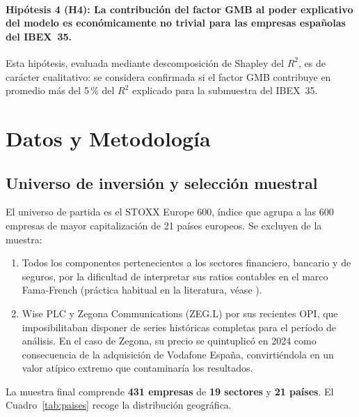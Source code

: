 \documentclass[12pt, a4paper]{article}
\begin{document}
\paragraph{Hip\'otesis 4 (H4): La contribuci\'on del factor GMB al poder explicativo
del modelo es econ\'omicamente no trivial para las empresas espa\~nolas del IBEX~35.}
Esta hip\'otesis, evaluada mediante descomposici\'on de Shapley del $R^2$, es de
car\'acter cualitativo: se considera confirmada si el factor GMB contribuye en promedio
m\'as del 5\,\% del $R^2$ explicado para la submuestra del IBEX~35.

\section{Datos y Metodolog\'ia}
\label{sec:metodologia}

\subsection{Universo de inversi\'on y selecci\'on muestral}
\label{subsec:muestra}

El universo de partida es el STOXX Europe 600, \'indice que agrupa a las 600 empresas
de mayor capitalizaci\'on de 21 pa\'ises europeos. Se excluyen de la muestra:

\begin{enumerate}
  \item Todos los componentes pertenecientes a los sectores financiero, bancario y de
        seguros, por la dificultad de interpretar sus ratios contables en el marco
        Fama-French (pr\'actica habitual en la literatura, v\'ease \cite{famafrench1993}).
  \item Wise PLC y Zegona Communications (ZEG.L) por sus recientes OPI, que
        imposibilitaban disponer de series hist\'oricas completas para el per\'iodo
        de an\'alisis. En el caso de Zegona, su precio se quintuplicó en 2024 como
        consecuencia de la adquisici\'on de Vodafone Espa\~na, convirti\'endola en
        un valor at\'ipico extremo que contaminar\'ia los resultados.
\end{enumerate}

La muestra final comprende \textbf{431 empresas} de \textbf{19 sectores} y
\textbf{21 pa\'ises}. El Cuadro~\ref{tab:paises} recoge la distribuci\'on geogr\'afica.
\end{document}
